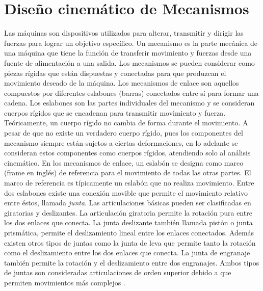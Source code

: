 \section{Diseño cinemático de Mecanismos}\label{sec: Diseño cinemático de Mecanismos}
Las máquinas son dispositivos utilizados para alterar, transmitir y dirigir las fuerzas para lograr un objetivo específico. Un mecanismo es la parte mecánica de una máquina que tiene la función de transferir movimiento y fuerzas desde una fuente de alimentación a una salida. Los mecanismos se pueden considerar como piezas rígidas que están dispuestas y conectadas para que produzcan el movimiento deseado de la máquina. Los mecanismos de enlace son aquellos compuestos por diferentes eslabones (barras) conectados entre sí para formar una cadena. Los eslabones son las partes individuales del mecanismo y se consideran cuerpos rígidos que se encadenan  para transmitir movimiento y fuerza. Teóricamente, un cuerpo rígido no cambia de forma durante el movimiento. A pesar de que no existe un verdadero cuerpo rígido, pues los componentes del mecanismo siempre están sujetos a ciertas deformaciones, en lo adelante se consideran estos componentes como cuerpos rígidos, atendiendo solo al análisis cinemático. En los mecanismos de enlace, un eslabón se designa como marco (frame en inglés) de referencia para el movimiento de todas las otras partes. El marco de referencia es típicamente un eslabón que no realiza movimiento. Entre dos eslabones existe una conexión movible que permite el movimiento relativo entre éstos, llamada \textit{junta}. Las articulaciones básicas pueden ser clasificadas en giratorias y deslizantes. La articulación giratoria permite la rotación pura entre los dos enlaces que conecta. La junta deslizante también llamada pistón o junta prismática, permite el deslizamiento lineal entre los enlaces conectados. Además existen otros tipos de juntas como la junta de leva que permite tanto la rotación como el deslizamiento entre los dos enlaces que conecta. La junta de engranaje también permite la rotación y el deslizamiento entre dos engranajes. Ambos tipos de juntas son consideradas articulaciones de orden superior debido a que permiten movimientos más complejos \cite{myszka2004machines}.

